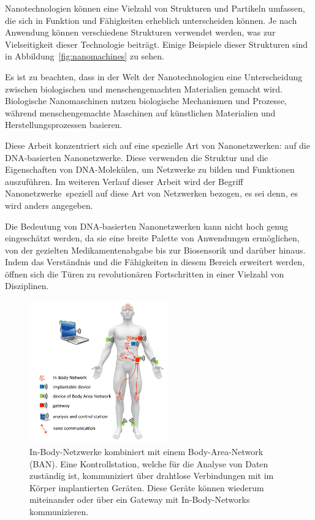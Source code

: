 Nanotechnologien können eine Vielzahl von Strukturen und Partikeln umfassen, die sich in Funktion und Fähigkeiten erheblich unterscheiden können. Je nach Anwendung können verschiedene Strukturen verwendet werden, was zur Vielseitigkeit dieser Technologie beiträgt. Einige Beispiele dieser Strukturen sind in Abbildung~\ref{fig:nanomachines} zu sehen.

Es ist zu beachten, dass in der Welt der Nanotechnologien eine Unterscheidung zwischen biologischen und menschengemachten Materialien gemacht wird. Biologische Nanomaschinen nutzen biologische Mechanismen und Prozesse, während menschengemachte Maschinen auf künstlichen Materialien und Herstellungsprozessen basieren.

Diese Arbeit konzentriert sich auf eine spezielle Art von Nanonetzwerken: auf die DNA-basierten Nanonetzwerke. Diese verwenden die Struktur und die Eigenschaften von DNA-Molekülen, um Netzwerke zu bilden und Funktionen auszuführen. Im weiteren Verlauf dieser Arbeit wird der Begriff \glqq Nanonetzwerke\grqq~speziell auf diese Art von Netzwerken bezogen, es sei denn, es wird anders angegeben.

Die Bedeutung von DNA-basierten Nanonetzwerken kann nicht hoch genug eingeschätzt werden, da sie eine breite Palette von Anwendungen ermöglichen, von der gezielten Medikamentenabgabe bis zur Biosensorik und darüber hinaus. Indem das Verständnis und die Fähigkeiten in diesem Bereich erweitert werden, öffnen sich die Türen zu revolutionären Fortschritten in einer Vielzahl von Disziplinen.

\begin{figure}
	\centering 
	\includegraphics[width=0.53\textwidth]{images/In-Body_Networks.png}
	\caption[In-Body-Netzwerke]{In-Body-Netzwerke kombiniert mit einem Body-Area-Network (BAN). Eine Kontrollstation, welche für die Analyse von Daten zuständig ist, kommuniziert über drahtlose Verbindungen mit im Körper implantierten Geräten. Diese Geräte können wiederum miteinander oder über ein Gateway mit In-Body-Networks kommunizieren.\cite{dressler2015nanothings}}
	\label{fig:in-body_network}
\end{figure}

